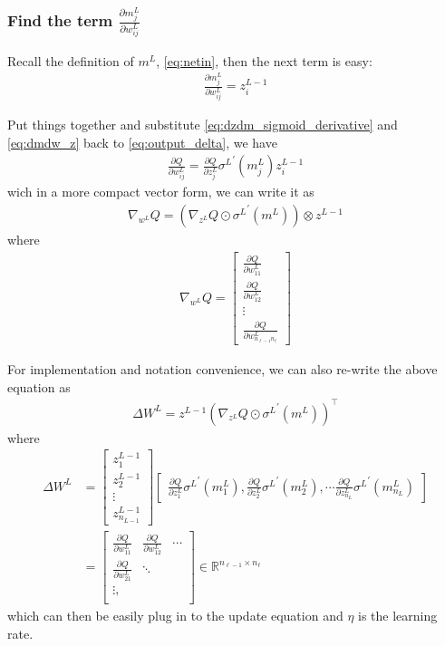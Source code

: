 \documentclass{article} [10pt] %
\begin{document}
\subsubsection{Find the term $\frac{\partial m^L_{j}}{\partial w^L_{ij}}$}
Recall the definition of $m^L$, \eqref{eq:netin}, then the next term is easy:
\begin{align}\label{eq:dmdw_z}
\boxed{
	\frac{\partial m^L_{j}}{\partial w^L_{ij}} = z^{L-1}_i
}
\end{align}

Put things together and substitute \eqref{eq:dzdm_sigmoid_derivative}  and \eqref{eq:dmdw_z} back to \eqref{eq:output_delta}, we have
\begin{align}
	\frac{\partial Q}{\partial w^L_{ij}} = \frac{\partial Q}{\partial z^L_{j}}
							{\sigma^L}^\prime(m^L_{j}) 
							z^{L-1}_i
\end{align}
wich in a more compact vector form, we can write it as 
\begin{align}
	\nabla_{w^L} Q = (\nabla_{z^L}Q \odot {\sigma^L}^\prime(m^L)) \otimes z^{L-1}
\end{align}
where
\begin{align}
	\nabla_{w^L} Q = \begin{bmatrix}
		\frac{\partial Q}{\partial w^L_{11}} \\
		\frac{\partial Q}{\partial w^L_{12}} \\
		\vdots\\
		\frac{\partial Q}{\partial w^L_{n_{\ell-1}n_\ell}}
	\end{bmatrix}
\end{align}

For implementation and notation convenience, we can also re-write the above equation as
\begin{align} \label{eq:delta_w_out}
\boxed{
	\Delta W^L = z^{L-1}(\nabla_{z^L}Q \odot {\sigma^L}^\prime(m^L))^\top
}
\end{align}
where
\begin{align}
	\Delta W^L &= \begin{bmatrix}z^{L-1}_1\\ z^{L-1}_2\\ \vdots \\z^{L-1}_{n_{L-1}}\end{bmatrix}
	\begin{bmatrix}   \frac{\partial Q}{\partial z^L_{1}}{\sigma^L}^\prime(m^L_{1}),
	\frac{\partial Q}{\partial z^L_{2}}{\sigma^L}^\prime(m^L_{2}), \cdots
	\frac{\partial Q}{\partial z^L_{n_L}}{\sigma^L}^\prime(m^L_{n_L})
	\end{bmatrix}\\
	 &= \begin{bmatrix}
				\frac{\partial Q}{\partial w^L_{11}} &\frac{\partial Q}{\partial w^L_{12}} &\cdots \\
				\frac{\partial Q}{\partial w^L_{21}} &\ddots \\
				\vdots,\\
				\end{bmatrix} \in \mathbb{R}^{n_{\ell-1}\times n_\ell}
\end{align}
which can then be easily plug in to the update equation  and $\eta$ is the learning rate.
\end{document}
